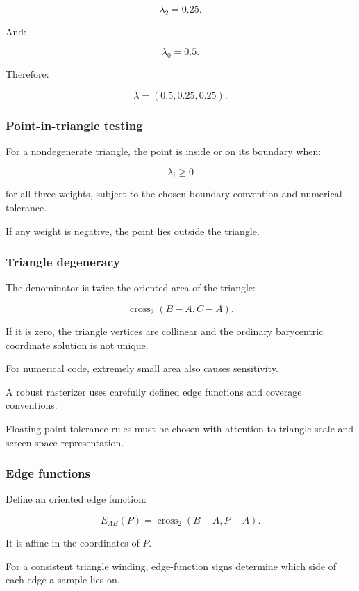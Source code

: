 \[
 \lambda_2=0.25.
\]

And:

\[
 \lambda_0=0.5.
\]

Therefore:

\[
 \boxed{ \lambda=(0.5,0.25,0.25) }.
\]

\subsubsection{Point-in-triangle testing}\label{point-in-triangle-testing}

For a nondegenerate triangle, the point is inside or on its boundary when:

\[
 \boxed{ \lambda_i\ge0 }
\]

for all three weights, subject to the chosen boundary convention and numerical tolerance.

If any weight is negative, the point lies outside the triangle.

\subsubsection{Triangle degeneracy}\label{triangle-degeneracy}

The denominator is twice the oriented area of the triangle:

\[
 \operatorname{cross}_2(B-A,C-A).
\]

If it is zero, the triangle vertices are collinear and the ordinary barycentric coordinate solution is not unique.

For numerical code, extremely small area also causes sensitivity.

A robust rasterizer uses carefully defined edge functions and coverage conventions.

Floating-point tolerance rules must be chosen with attention to triangle scale and screen-space representation.

\subsubsection{Edge functions}\label{edge-functions}

Define an oriented edge function:

\[
 \boxed{ E_{AB}(P)= \operatorname{cross}_2(B-A,P-A) }.
\]

It is affine in the coordinates of \(P\).

For a consistent triangle winding, edge-function signs determine which side of each edge a sample lies on.


